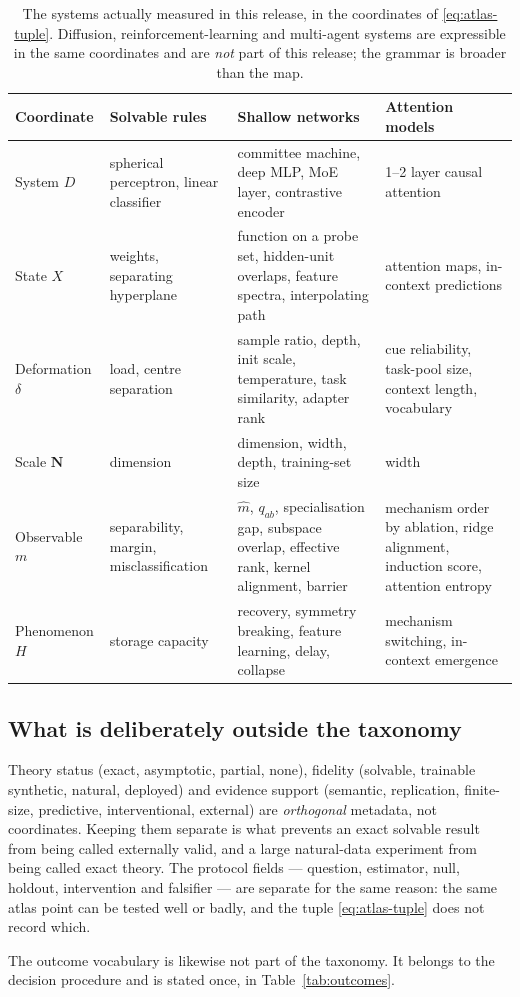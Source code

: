 \begin{table}[tbp]
\centering\small
\begin{tabularx}{\linewidth}{@{}p{20mm}YYY@{}}
\toprule
Coordinate & Solvable rules & Shallow networks & Attention models \\
\midrule
System $D$ & spherical perceptron, linear classifier & committee machine, deep
MLP, MoE layer, contrastive encoder & 1--2 layer causal attention \\
State $X$ & weights, separating hyperplane & function on a probe set,
hidden-unit overlaps, feature spectra, interpolating path & attention maps,
in-context predictions \\
Deformation $\delta$ & load, centre separation & sample ratio, depth, init
scale, temperature, task similarity, adapter rank & cue reliability, task-pool
size, context length, vocabulary \\
Scale $\mathbf N$ & dimension & dimension, width, depth, training-set size &
width \\
Observable $m$ & separability, margin, misclassification & $\hat m$, $q_{ab}$,
specialisation gap, subspace overlap, effective rank, kernel alignment, barrier
& mechanism order by ablation, ridge alignment, induction score, attention
entropy \\
Phenomenon $H$ & storage capacity & recovery, symmetry breaking, feature
learning, delay, collapse & mechanism switching, in-context emergence \\
\bottomrule
\end{tabularx}
\caption{The systems actually measured in this release, in the coordinates of
\eqref{eq:atlas-tuple}. Diffusion, reinforcement-learning and multi-agent
systems are expressible in the same coordinates and are \emph{not} part of this
release; the grammar is broader than the map.}
\label{tab:domain-crosswalk}
\end{table}

\subsection{What is deliberately outside the taxonomy}

Theory status (exact, asymptotic, partial, none), fidelity (solvable,
trainable synthetic, natural, deployed) and evidence support (semantic,
replication, finite-size, predictive, interventional, external) are
\emph{orthogonal} metadata, not coordinates. Keeping them separate is what
prevents an exact solvable result from being called externally valid, and a
large natural-data experiment from being called exact theory. The protocol
fields --- question, estimator, null, holdout, intervention and falsifier ---
are separate for the same reason: the same atlas point can be tested well or
badly, and the tuple \eqref{eq:atlas-tuple} does not record which.

The outcome vocabulary is likewise not part of the taxonomy. It belongs to the
decision procedure and is stated once, in Table~\ref{tab:outcomes}.

\FloatBarrier
